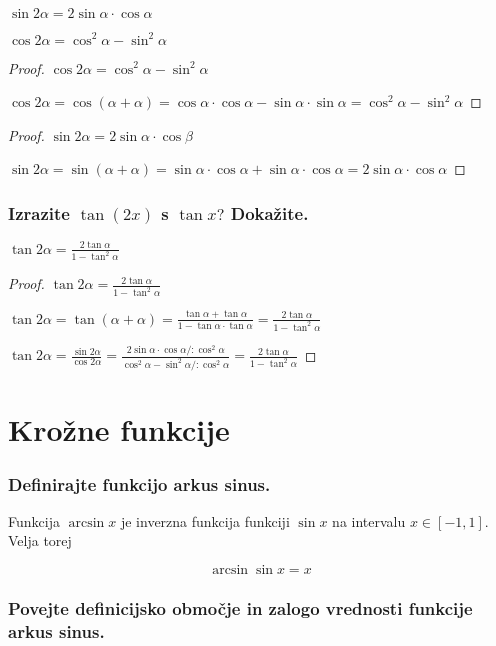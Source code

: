 \documentclass{article}
\begin{document}
$\sin 2 \alpha=2 \sin \alpha \cdot \cos \alpha$

$\cos 2 \alpha=\cos ^{2} \alpha-\sin ^{2} \alpha$

\begin{proof}
    $\cos 2 \alpha=\cos ^{2} \alpha-\sin ^{2} \alpha$

    $\cos 2 \alpha=\cos (\alpha+\alpha)=\cos \alpha \cdot \cos \alpha-\sin \alpha \cdot \sin \alpha=\cos ^{2} \alpha-\sin ^{2} \alpha$
\end{proof}

\begin{proof}
    $\sin 2 \alpha=2 \sin \alpha \cdot \cos \beta$

$\sin 2 \alpha=\sin (\alpha+\alpha)=\sin \alpha \cdot \cos \alpha+\sin \alpha \cdot \cos \alpha=2 \sin \alpha \cdot \cos \alpha$
\end{proof}

\subsubsection*{Izrazite $\tan (2 x)$  s $\tan x ?$ Dokažite.}

$\tan 2 \alpha=\frac{2\tan \alpha}{1-\tan^2 \alpha }$

\begin{proof}
    $\tan 2 \alpha=\frac{2\tan \alpha}{1-\tan^2 \alpha }$

$\tan 2 \alpha=\tan (\alpha+\alpha)=\frac{\tan \alpha+\tan \alpha}{1-\tan \alpha \cdot \tan \alpha}=\frac{2 \tan \alpha}{1-\tan ^{2} \alpha}$

$\tan 2 \alpha=\frac{\sin 2 \alpha}{\cos 2 \alpha}=\frac{2 \sin \alpha \cdot \cos \alpha /: \cos ^{2} \alpha}{\cos ^{2} \alpha-\sin ^{2} \alpha /: \cos ^{2} \alpha}=\frac{2 \tan \alpha}{1-\tan ^{2} \alpha}$
\end{proof}

\section{Krožne funkcije}
\subsubsection*{Definirajte funkcijo arkus sinus.}

Funkcija $\arcsin x$ je inverzna funkcija funkciji $\sin x$ na intervalu $x \in [-1, 1]$. Velja torej

$$
\arcsin{\sin{x}} = x
$$

\subsubsection*{Povejte definicijsko območje in zalogo vrednosti funkcije arkus sinus.}
\end{document}
